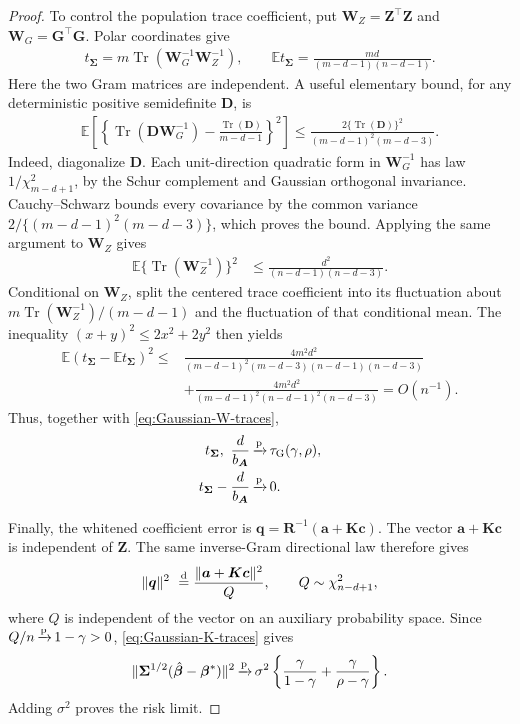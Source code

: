 \documentclass{article}
\theoremstyle{plain}
\theoremstyle{definition}
\theoremstyle{definition}
\DeclarePairedDelimiter\norm{\lVert}{\rVert}
\newcommand{\limp}{{\,\smash{\xrightarrow{\mathrm{p}}}}\,}
\DeclareMathOperator{\trace}{Tr}
\def\E{{\mathbb{E}}}
\def\mathbold{\boldsymbol}
\def\cal{\mathcal}
\def\ba{\mathbold{a}}\def\bfa{\mathbold{a}}\def\ahat{\widehat{a}}\def\atil{\widetilde{a}}
\def\bA{\mathbold{A}}\def\calA{{\cal A}}\def\scrA{{\mathscr A}}\def\Ahat{\widehat{A}}\def\Atil{{\widetilde A}}
\def\bc{\mathbold{c}}\def\chat{\widehat{c}}\def\ctil{\widetilde{c}}
\def\bD{\mathbold{D}}\def\calD{{\cal D}}\def\scrD{{\mathscr D}}\def\Dhat{\widehat{D}}\def\Dtil{{\widetilde D}}
\def\bG{\mathbold{G}}\def\calG{{\cal G}}\def\scrG{{\mathscr G}}\def\Ghat{\widehat{G}}\def\Gtil{{\widetilde G}}
\def\bK{\mathbold{K}}\def\hbK{{\widehat{\bK}}}\def\tbK{{\widetilde{\bK}}}
\def\bq{\mathbold{q}}\def\qhat{\widehat{q}}\def\qtil{\widetilde{q}}\def\qbar{{\overline q}}
\def\bR{\mathbold{R}}\def\hbR{{\widehat{\bR}}}\def\tbR{{\widetilde{\bR}}}
\def\bW{\mathbold{W}}\def\hbW{{\widehat{\bW}}}\def\tbW{{\widetilde{\bW}}}
\def\bZ{\mathbold{Z}}\def\hbZ{{\widehat{\bZ}}}\def\tbZ{{\widetilde{\bZ}}}
\def\bbeta{\mathbold{\beta}}\def\betahat{\widehat{\beta}}\def\hbeta{\widehat{\beta}}
\def\hbbeta{\hat{\bbeta}{}}
\def\bSigma{\mathbold{\Sigma}}\def\hbSigma{{\widehat{\bSigma}}}
\begin{document}
\begin{proof}
To control the population trace coefficient, put
$\bW_Z=\bZ^\top\bZ$ and $\bW_G=\bG^\top\bG$. Polar coordinates give
\begin{align*}
    t_{\bSigma}=m\trace(\bW_G^{-1}\bW_Z^{-1}),
    \qquad
    \E t_{\bSigma}=\frac{md}{(m-d-1)(n-d-1)}.
\end{align*}
Here the two Gram matrices are independent. A useful elementary bound,
for any deterministic positive semidefinite $\bD$, is
\begin{align*}
    \E\left[
      \left\{\trace(\bD\bW_G^{-1})-
             \frac{\trace(\bD)}{m-d-1}\right\}^2\right]
    \leq\frac{2\{\trace(\bD)\}^2}{(m-d-1)^2(m-d-3)}.
\end{align*}
Indeed, diagonalize $\bD$. Each unit-direction quadratic form in
$\bW_G^{-1}$ has law $1/\chi^2_{m-d+1}$, by the Schur complement and
Gaussian orthogonal invariance. Cauchy--Schwarz bounds every covariance
by the common variance $2/\{(m-d-1)^2(m-d-3)\}$, which proves the bound.
Applying the same argument to $\bW_Z$ gives
\begin{align*}
    \E\{\trace(\bW_Z^{-1})\}^2
       &\leq\frac{d^2}{(n-d-1)(n-d-3)}.
\end{align*}
Conditional on $\bW_Z$, split the centered trace coefficient into
its fluctuation about $m\trace(\bW_Z^{-1})/(m-d-1)$ and the fluctuation
of that conditional mean. The inequality $(x+y)^2\leq2x^2+2y^2$ then yields
\begin{align*}
    \E(t_{\bSigma}-\E t_{\bSigma})^2
    \leq{}&
    \frac{4m^2d^2}
    {(m-d-1)^2(m-d-3)(n-d-1)(n-d-3)}\\
    &+\frac{4m^2d^2}
    {(m-d-1)^2(n-d-1)^2(n-d-3)}=O(n^{-1}).
\end{align*}
Thus, together with \eqref{eq:Gaussian-W-traces},
\begin{align}
    t_{\bSigma},\ \frac{d}{b_{\bA}}
    &\limp\tau_{\rm G}(\gamma,\rho),\notag\\
    t_{\bSigma}-\frac{d}{b_{\bA}}&\limp0.
    \label{eq:Gaussian-trace-limits}
\end{align}

Finally, the whitened coefficient error is
$\bq=\bR^{-1}(\ba+\bK\bc)$. The vector $\ba+\bK\bc$ is independent
of $\bZ$. The same inverse-Gram directional law therefore gives
\begin{align*}
    \norm{\bq}^2
       \ \stackrel{\rm d}{=}
       \frac{\norm{\ba+\bK\bc}^2}{Q},
    \qquad Q\sim\chi^2_{n-d+1},
\end{align*}
where $Q$ is independent of the vector on an auxiliary probability space.
Since $Q/n\limp1-\gamma>0$, \eqref{eq:Gaussian-K-traces} gives
\begin{align*}
    \norm{\bSigma^{1/2}(\hbbeta-\bbeta^*)}^2
    \limp\sigma^2\left\{
       \frac{\gamma}{1-\gamma}+\frac{\gamma}{\rho-\gamma}\right\}.
\end{align*}
Adding $\sigma^2$ proves the risk limit.


\end{proof}
\end{document}
